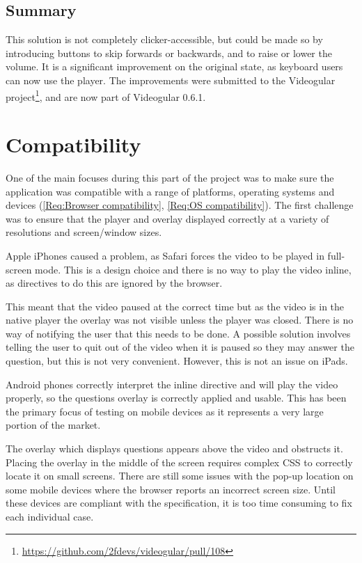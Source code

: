 \subsection{Summary}

This solution is not completely clicker-accessible, but could be made so by introducing buttons to skip forwards or backwards, and to raise or lower the volume. It is a significant improvement on the original state, as keyboard users can now use the player. The improvements were submitted to the \gls{Videogular} project\footnote{\url{https://github.com/2fdevs/videogular/pull/108}}, and are now part of \gls{Videogular} 0.6.1.

\section{Compatibility}
\label{Section:Compatibility}

One of the main focuses during this part of the project was to make sure the application was compatible with a range of platforms, operating systems and devices (\cref{Req:Browser compatibility}, \cref{Req:OS compatibility}). The first challenge was to ensure that the player and overlay displayed correctly at a variety of resolutions and screen/window sizes.

Apple iPhones caused a problem, as Safari forces the video to be played in full-screen mode. This is a design choice and there is no way to play the video inline, as directives to do this are ignored by the browser.

This meant that the video paused at the correct time but as the video is in the native player the overlay was not visible unless the player was closed. There is no way of notifying the user that this needs to be done. A possible solution involves telling the user to quit out of the video when it is paused so they may answer the question, but this is not very convenient. However, this is not an issue on iPads.

Android phones correctly interpret the inline directive and will play the video properly, so the questions overlay is correctly applied and usable. This has been the primary focus of testing on mobile devices as it represents a very large portion of the market.

The overlay which displays questions appears above the video and obstructs it. Placing the overlay in the middle of the screen requires complex \gls{CSS} to correctly locate it on small screens. There are still some issues with the pop-up location on some mobile devices where the browser reports an incorrect screen size. Until these devices are compliant with the specification, it is too time consuming to fix each individual case.

